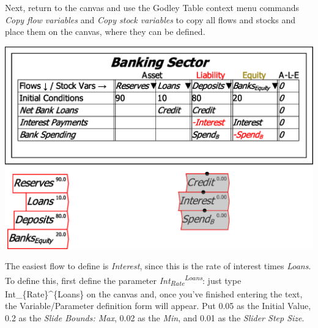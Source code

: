 Next, return to the canvas and use the Godley Table context menu commands
\emph{Copy flow variables} and \emph{Copy stock variables} to copy
all flows and stocks and place them on the canvas, where they can
be defined.

\includegraphics{images/MonetaryModel01GodleyTable05DefineFlows01}

The easiest flow to define is \emph{Interest}, since this is the rate
of interest times \emph{Loans}. To define this, first define the parameter
\emph{Int}\textsubscript{\emph{Rate}}\emph{}\textsuperscript{\emph{Loans}}:
just type Int\_\{Rate\}\textasciicircum\{Loans\} on the canvas and,
once you've finished entering the text, the Variable/Parameter definition
form will appear. Put 0.05 as the Initial Value, 0.2 as the \emph{Slide
Bounds: Max}, 0.02 as the \emph{Min}, and 0.01 as the \emph{Slider
Step Size}.

